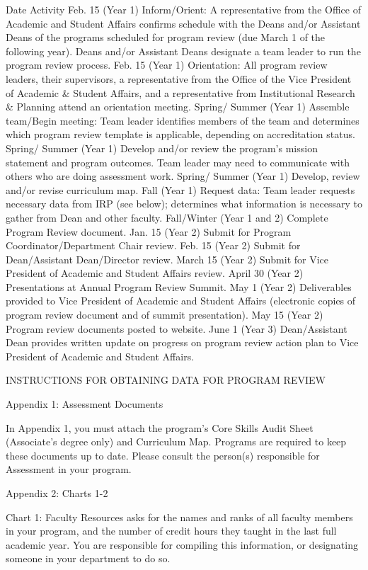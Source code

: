 Date
Activity
Feb. 15 (Year 1)
Inform/Orient: A representative from the Office of Academic and Student Affairs confirms schedule with the Deans and/or Assistant Deans of the programs scheduled for program review (due March 1 of the following year). Deans and/or Assistant Deans designate a team leader to run the program review process.
Feb. 15 (Year 1)
Orientation: All program review leaders, their supervisors, a representative from the Office of the Vice President of Academic \& Student Affairs, and a representative from Institutional Research \& Planning attend an orientation meeting.
Spring/
Summer (Year 1)
Assemble team/Begin meeting: Team leader identifies members of the team and determines which program review template is applicable, depending on accreditation status.
Spring/
Summer (Year 1)
Develop and/or review the program’s mission statement and program outcomes. Team leader may need to communicate with others who are doing assessment work.
Spring/
Summer (Year 1)
Develop, review and/or revise curriculum map.
Fall (Year 1)
Request data: Team leader requests necessary data from IRP (see below); determines what information is necessary to gather from Dean and other faculty.
Fall/Winter (Year 1 and 2)
Complete Program Review document.
Jan. 15 (Year 2)
Submit for Program Coordinator/Department Chair review.
Feb. 15 (Year 2)
Submit for Dean/Assistant Dean/Director review.
March 15 (Year 2)
Submit for Vice President of Academic and Student Affairs review.
April 30 (Year 2)
Presentations at Annual Program Review Summit.
May 1 (Year 2)
Deliverables provided to Vice President of Academic and Student Affairs (electronic copies of program review document and of summit presentation).
May 15 (Year 2)
Program review documents posted to website.
June 1 (Year 3)
Dean/Assistant Dean provides written update on progress on program review action plan to Vice President of Academic and Student Affairs.





INSTRUCTIONS FOR OBTAINING DATA FOR PROGRAM REVIEW

Appendix 1: Assessment Documents

In Appendix 1, you must attach the program’s Core Skills Audit Sheet (Associate’s degree only) and Curriculum Map. Programs are required to keep these documents up to date. Please consult the person(s) responsible for Assessment in your program.


Appendix 2: Charts 1-2

Chart 1: Faculty Resources asks for the names and ranks of all faculty members in your program, and the number of credit hours they taught in the last full academic year. You are responsible for compiling this information, or designating someone in your department to do so.

